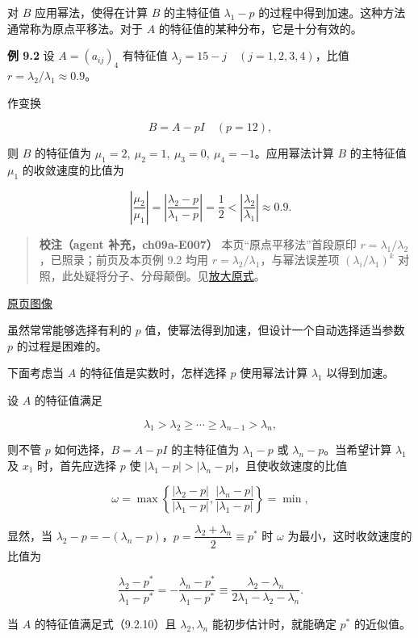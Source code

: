 \documentclass[
  10pt,
  fontset=fandol]{ctexart}
\begin{document}
对 \(B\) 应用幂法，使得在计算 \(B\) 的主特征值 \(\lambda_1-p\) 的过程中得到加速。这种方法通常称为原点平移法。对于 \(A\) 的特征值的某种分布，它是十分有效的。

\textbf{例 9.2} 设 \(A=(a_{ij})_4\) 有特征值 \(\lambda_j=15-j\quad(j=1,2,3,4)\)，比值 \(r=\lambda_2/\lambda_1\approx0.9\)。

作变换

\[
B=A-pI\quad(p=12),
\]

则 \(B\) 的特征值为 \(\mu_1=2,\ \mu_2=1,\ \mu_3=0,\ \mu_4=-1\)。应用幂法计算 \(B\) 的主特征值 \(\mu_1\) 的收敛速度的比值为

\[
\left|\frac{\mu_2}{\mu_1}\right|=\left|\frac{\lambda_2-p}{\lambda_1-p}\right|=\frac12<\left|\frac{\lambda_2}{\lambda_1}\right|\approx0.9.
\]

\begin{quote}
\textbf{校注（agent 补充，ch09a-E007）} 本页``原点平移法''首段原印 \(r=\lambda_1/\lambda_2\)，已照录；前页及本页例 9.2 均用 \(r=\lambda_2/\lambda_1\)，与幂法误差项 \((\lambda_i/\lambda_1)^k\) 对照，此处疑将分子、分母颠倒。见\href{../assets/ch09a/review-p238-ratio.png}{放大原式}。
\end{quote}

\href{../../source-images/pdf-239.jpeg}{原页图像}

虽然常常能够选择有利的 \(p\) 值，使幂法得到加速，但设计一个自动选择适当参数 \(p\) 的过程是困难的。

下面考虑当 \(A\) 的特征值是实数时，怎样选择 \(p\) 使用幂法计算 \(\lambda_1\) 以得到加速。

设 \(A\) 的特征值满足

\[
\lambda_1>\lambda_2\geq\cdots\geq\lambda_{n-1}>\lambda_n,
\tag{9.2.10}
\]

则不管 \(p\) 如何选择，\(B=A-pI\) 的主特征值为 \(\lambda_1-p\) 或 \(\lambda_n-p\)。当希望计算 \(\lambda_1\) 及 \(x_1\) 时，首先应选择 \(p\) 使 \(|\lambda_1-p|>|\lambda_n-p|\)，且使收敛速度的比值

\[
\omega=\max\left\{\frac{|\lambda_2-p|}{|\lambda_1-p|},\frac{|\lambda_n-p|}{|\lambda_1-p|}\right\}=\min,
\]

显然，当 \(\lambda_2-p=-(\lambda_n-p)\)，\(p=\dfrac{\lambda_2+\lambda_n}{2}\equiv p^*\) 时 \(\omega\) 为最小，这时收敛速度的比值为

\[
\frac{\lambda_2-p^*}{\lambda_1-p^*}=-\frac{\lambda_n-p^*}{\lambda_1-p^*}\equiv\frac{\lambda_2-\lambda_n}{2\lambda_1-\lambda_2-\lambda_n}.
\]

当 \(A\) 的特征值满足式（9.2.10）且 \(\lambda_2,\lambda_n\) 能初步估计时，就能确定 \(p^*\) 的近似值。
\end{document}
